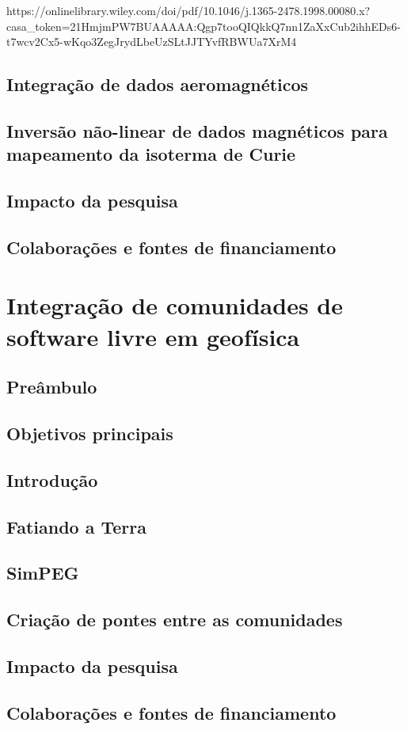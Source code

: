 \documentclass[11pt,a4paper,oneside]{book}
\begin{document}
https://onlinelibrary.wiley.com/doi/pdf/10.1046/j.1365-2478.1998.00080.x?casa_token=21HmjmPW7BUAAAAA:Qgp7tooQIQkkQ7nn1ZaXxCub2ihhEDs6-t7wcv2Cx5-wKqo3ZegJrydLbeUzSLtJJTYvfRBWUa7XrM4

\section{Integração de dados aeromagnéticos}

\section{Inversão não-linear de dados magnéticos para mapeamento da isoterma de Curie}

\section{Impacto da pesquisa}

\section{Colaborações e fontes de financiamento}


\chapter{Integração de comunidades de software livre em geofísica}

\section{Preâmbulo}

\section{Objetivos principais}

\section{Introdução}

\section{Fatiando a Terra}

\section{SimPEG}

\section{Criação de pontes entre as comunidades}

\section{Impacto da pesquisa}

\section{Colaborações e fontes de financiamento}

\backmatter


\end{document}
